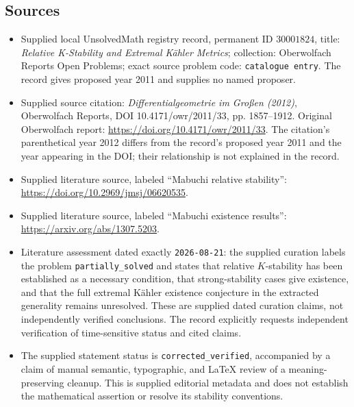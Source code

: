 \documentclass[11pt]{article}
\begin{document}
\subsection{Sources}
\begin{itemize}
\item Supplied local UnsolvedMath registry record, permanent ID \(30001824\), title: \emph{Relative K-Stability and Extremal Kähler Metrics}; collection: Oberwolfach Reports Open Problems; exact source problem code: \texttt{catalogue entry}. The record gives proposed year 2011 and supplies no named proposer.
\item Supplied source citation: \emph{Differentialgeometrie im Großen (2012)}, Oberwolfach Reports, DOI 10.4171/owr/2011/33, pp. 1857--1912. Original Oberwolfach report: \url{https://doi.org/10.4171/owr/2011/33}. The citation's parenthetical year 2012 differs from the record's proposed year 2011 and the year appearing in the DOI; their relationship is not explained in the record.
\item Supplied literature source, labeled ``Mabuchi relative stability'': \url{https://doi.org/10.2969/jmsj/06620535}.
\item Supplied literature source, labeled ``Mabuchi existence results'': \url{https://arxiv.org/abs/1307.5203}.
\item Literature assessment dated exactly \texttt{2026-08-21}: the supplied curation labels the problem \texttt{partially\_solved} and states that relative \(K\)-stability has been established as a necessary condition, that strong-stability cases give existence, and that the full extremal Kähler existence conjecture in the extracted generality remains unresolved. These are supplied dated curation claims, not independently verified conclusions. The record explicitly requests independent verification of time-sensitive status and cited claims.
\item The supplied statement status is \texttt{corrected\_verified}, accompanied by a claim of manual semantic, typographic, and LaTeX review of a meaning-preserving cleanup. This is supplied editorial metadata and does not establish the mathematical assertion or resolve its stability conventions.
\end{itemize}
\end{document}
